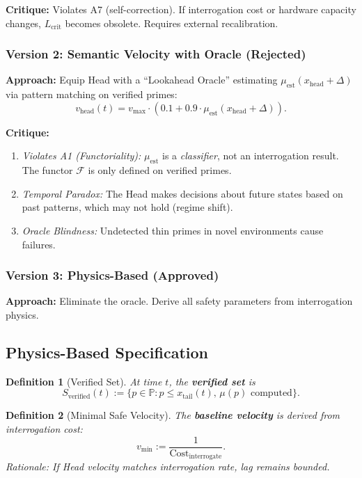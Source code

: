 \documentclass[12pt,a4paper]{article}
\newtheorem{definition}{Definition}[section]
\begin{document}
\textbf{Critique:} Violates A7 (self-correction). If interrogation cost or hardware capacity changes, $L_{\text{crit}}$ becomes obsolete. Requires external recalibration.

\subsubsection{Version 2: Semantic Velocity with Oracle (Rejected)}

\textbf{Approach:} Equip Head with a ``Lookahead Oracle'' estimating $\mu_{\text{est}}(x_{\text{head}} + \Delta)$ via pattern matching on verified primes:
\[
v_{\text{head}}(t) = v_{\max} \cdot (0.1 + 0.9 \cdot \mu_{\text{est}}(x_{\text{head}} + \Delta)).
\]

\textbf{Critique:} 
\begin{enumerate}
\item \textit{Violates A1 (Functoriality):} $\mu_{\text{est}}$ is a \textit{classifier}, not an interrogation result. The functor $\mathcal{F}$ is only defined on verified primes.
\item \textit{Temporal Paradox:} The Head makes decisions about future states based on past patterns, which may not hold (regime shift).
\item \textit{Oracle Blindness:} Undetected thin primes in novel environments cause failures.
\end{enumerate}

\subsubsection{Version 3: Physics-Based (Approved)}

\textbf{Approach:} Eliminate the oracle. Derive all safety parameters from interrogation physics.

\subsection{Physics-Based Specification}

\begin{definition}[Verified Set]
At time $t$, the \textbf{verified set} is
\[
S_{\text{verified}}(t) := \{p \in \mathbb{P} : p \le x_{\text{tail}}(t), \, \mu(p) \text{ computed}\}.
\]
\end{definition}

\begin{definition}[Minimal Safe Velocity]
The \textbf{baseline velocity} is derived from interrogation cost:
\[
v_{\min} := \frac{1}{\text{Cost}_{\text{interrogate}}}.
\]
\textit{Rationale:} If Head velocity matches interrogation rate, lag remains bounded.
\end{definition}
\end{document}

